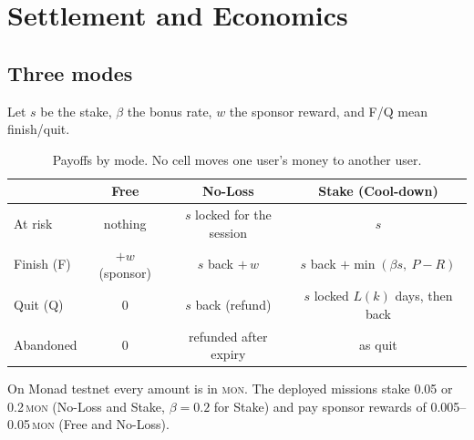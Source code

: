 \documentclass[10pt]{article}
\newcommand{\mon}{\textsc{mon}}
\begin{document}
\section{Settlement and Economics}\label{sec:econ}

\subsection{Three modes}
Let $s$ be the stake, $\beta$ the bonus rate, $w$ the sponsor reward, and \textsf{F}/\textsf{Q} mean finish/quit.

\begin{table}[h]\small\centering
\caption{Payoffs by mode. No cell moves one user's money to another user.}\label{tab:modes}
\begin{tabular}{@{}lccc@{}}\toprule
 & \textbf{Free} & \textbf{No-Loss} & \textbf{Stake (Cool-down)}\\\midrule
At risk & nothing & $s$ locked for the session & $s$ \\
Finish (\textsf{F}) & $+w$ (sponsor) & $s$ back $+\,w$ & $s$ back $+\min(\beta s,\ P-R)$ \\
Quit (\textsf{Q}) & $0$ & $s$ back (refund) & $s$ locked $L(k)$ days, then back \\
Abandoned & $0$ & refunded after expiry & as quit \\\bottomrule
\end{tabular}
\end{table}

\noindent On Monad testnet every amount is in \mon{}. The deployed missions stake 0.05 or 0.2\,\mon{} (No-Loss and
Stake, $\beta=0.2$ for Stake) and pay sponsor rewards of 0.005--0.05\,\mon{} (Free and No-Loss).
\end{document}
